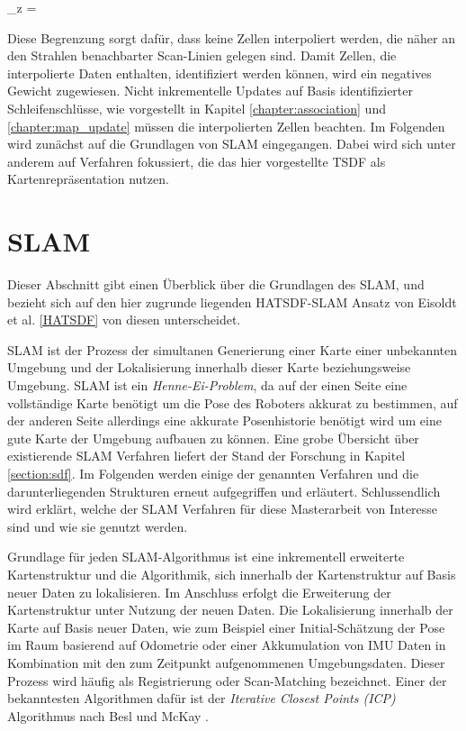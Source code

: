 \begin{myequation}
\Delta_z = 
\end{myequation}

Diese Begrenzung sorgt dafür, dass keine Zellen interpoliert werden, die näher an den Strahlen benachbarter Scan-Linien gelegen sind. Damit Zellen, die interpolierte Daten enthalten, identifiziert werden können, wird ein negatives Gewicht zugewiesen. Nicht inkrementelle Updates auf Basis identifizierter Schleifenschlüsse, wie vorgestellt in Kapitel \ref{chapter:association} und \ref{chapter:map_update} müssen die interpolierten Zellen beachten. Im Folgenden wird zunächst auf die Grundlagen von SLAM eingegangen. Dabei wird sich unter anderem auf Verfahren fokussiert, die das hier vorgestellte TSDF als Kartenrepräsentation nutzen.

\section{SLAM}
\label{section:slam}

Dieser Abschnitt gibt einen Überblick über die Grundlagen des SLAM, und bezieht sich auf den hier zugrunde liegenden HATSDF-SLAM Ansatz von Eisoldt et al. \ref{HATSDF} von diesen unterscheidet.

SLAM ist der Prozess der simultanen Generierung einer Karte einer unbekannten Umgebung und der Lokalisierung innerhalb dieser Karte beziehungsweise Umgebung. SLAM ist ein \emph{Henne-Ei-Problem}, da auf der einen Seite eine vollständige Karte benötigt um die Pose des Roboters akkurat zu bestimmen, auf der anderen Seite allerdings eine akkurate Posenhistorie benötigt wird um eine gute Karte der Umgebung aufbauen zu können. Eine grobe Übersicht über existierende SLAM Verfahren liefert der Stand der Forschung in Kapitel \ref{section:sdf}. Im Folgenden werden einige der genannten Verfahren und die darunterliegenden Strukturen erneut aufgegriffen und erläutert.
Schlussendlich wird erklärt, welche der SLAM Verfahren für diese Masterarbeit von Interesse sind und wie sie genutzt werden.

Grundlage für jeden SLAM-Algorithmus ist eine inkrementell erweiterte Kartenstruktur und die Algorithmik, sich innerhalb der Kartenstruktur auf Basis neuer Daten zu lokalisieren. Im Anschluss erfolgt die Erweiterung der Kartenstruktur unter Nutzung der neuen Daten. Die Lokalisierung innerhalb der Karte auf Basis neuer Daten, wie zum Beispiel einer Initial-Schätzung der Pose im Raum basierend auf Odometrie oder einer Akkumulation von IMU Daten in Kombination mit den zum Zeitpunkt aufgenommenen Umgebungsdaten. Dieser Prozess wird häufig als Registrierung oder Scan-Matching bezeichnet. Einer der bekanntesten Algorithmen dafür ist der \emph{Iterative Closest Points (ICP)} Algorithmus nach Besl und McKay \cite{Besl:1992}.


